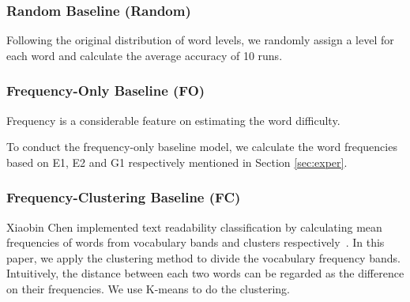 \subsubsection{Random Baseline (Random)}
Following the original distribution of word levels, we randomly assign a level for each word and calculate the average accuracy of 10 runs.

\subsubsection{Frequency-Only Baseline (FO)}
Frequency is a considerable feature on estimating the word difficulty.

To conduct the frequency-only baseline model, 
we calculate the word frequencies 
based on E1, E2 and G1 respectively mentioned in Section \ref{sec:exper}.


\subsubsection{Frequency-Clustering Baseline (FC)}
Xiaobin Chen implemented text readability classification  by calculating mean frequencies of words from vocabulary bands and clusters respectively~.
In this paper, we apply the clustering method to divide the vocabulary frequency bands.
Intuitively, the distance between each two words can be regarded as the difference on their frequencies. We use K-means to do the clustering.

